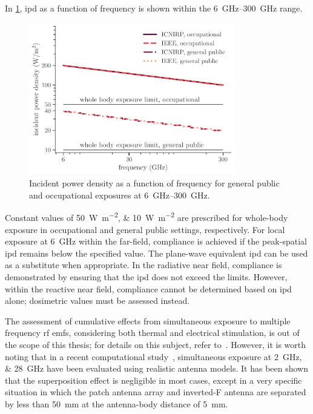 In \cref{fig:reference_levels}, \gls{ipd} as a function of frequency is shown within the \SIrange{6}{300}{\GHz} range.
\begin{figure}[t]
    \centering
    \includegraphics[width=0.8\textwidth]{artwork/reference_levels.pdf}
    \caption{Incident power density as a function of frequency for general public and occupational exposures at \SIrange{6}{300}{\GHz}.}
    \label{fig:reference_levels}
\end{figure}
Constant values of \SIlist{50;10}{\watt\per\m\squared} are prescribed for whole-body exposure in occupational and general public settings, respectively.
For local exposure at \SI{6}{\GHz} within the far-field, compliance is achieved if the peak-spatial \gls{ipd} remains below the specified value.
The plane-wave equivalent \gls{ipd} can be used as a substitute when appropriate.
In the radiative near field, compliance is demonstrated by ensuring that the \gls{ipd} does not exceed the limits.
However, within the reactive near field, compliance cannot be determined based on \gls{ipd} alone; dosimetric values must be assessed instead.

The assessment of cumulative effects from simultaneous exposure to multiple frequency \gls{rf} \gls{emf}s, considering both thermal and electrical stimulation, is out of the scope of this thesis; for details on this subject, refer to~\cite{ICNIRP2020Guidelines, IEEE2019Standard}.
However, it is worth noting that in a recent computational study~\cite{Miura2021Power}, simultaneous exposure at \SIlist{2;28}{\GHz} have been evaluated using realistic antenna models.
It has been shown that the superposition effect is negligible in most cases, except in a very specific situation in which the patch antenna array and inverted-F antenna are separated by less than \SI{50}{\mm} at the antenna-body distance of \SI{5}{\mm}.
